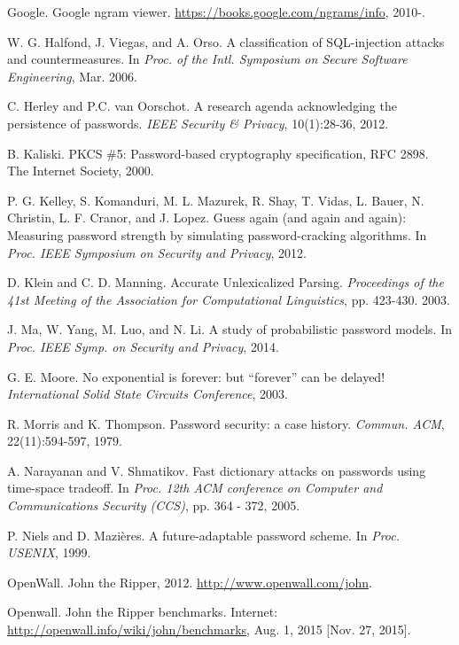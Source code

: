 \documentclass{article} %
\theoremstyle{definition}
\theoremstyle{theorem}
\theoremstyle{remark}
\theoremstyle{remark}
\begin{document}
\begin{thebibliography}{9}
Google. Google ngram viewer. \url{https://books.google.com/ngrams/info}, 2010-.

W. G. Halfond, J. Viegas, and A. Orso. A classification of SQL-injection attacks and countermeasures. In \textit{Proc. of the Intl. Symposium on Secure Software Engineering}, Mar. 2006.

C. Herley and P.C. van Oorschot. A research agenda acknowledging the persistence of passwords. \textit{IEEE Security \& Privacy}, 10(1):28-36, 2012.

B. Kaliski. PKCS \#5: Password-based cryptography specification, RFC 2898. The Internet Society, 2000.

P. G. Kelley, S. Komanduri, M. L. Mazurek, R. Shay, T. Vidas, L. Bauer, N. Christin, L. F. Cranor, and J. Lopez. Guess again (and again and again): Measuring password strength by simulating password-cracking algorithms. In \textit{Proc. IEEE Symposium on Security and Privacy}, 2012.

D. Klein and C. D. Manning. Accurate Unlexicalized Parsing. \emph{Proceedings of the 41st Meeting of the Association for Computational Linguistics}, pp. 423-430. 2003.

J. Ma, W. Yang, M. Luo, and N. Li. A study of probabilistic password models. In \textit{Proc. IEEE Symp. on Security and Privacy}, 2014.

G. E. Moore. No exponential is forever: but ``forever'' can be delayed! \emph{International Solid State Circuits Conference}, 2003. 

R. Morris and K. Thompson. Password security: a case history. \emph{Commun. ACM}, 22(11):594-597, 1979.

A. Narayanan and V. Shmatikov. Fast dictionary attacks on passwords using time-space tradeoff. In \textit{Proc. 12th ACM conference on Computer and Communications Security (CCS)}, pp. 364 - 372, 2005.

P. Niels and D. Mazi\`{e}res. A future-adaptable password scheme. In \emph{Proc. USENIX}, 1999.

OpenWall. John the Ripper, 2012. \url{http://www.openwall.com/john}.

Openwall. John the Ripper benchmarks. Internet: \url{http://openwall.info/wiki/john/benchmarks}, Aug. 1, 2015 [Nov. 27, 2015].


\end{thebibliography}
\end{document}
